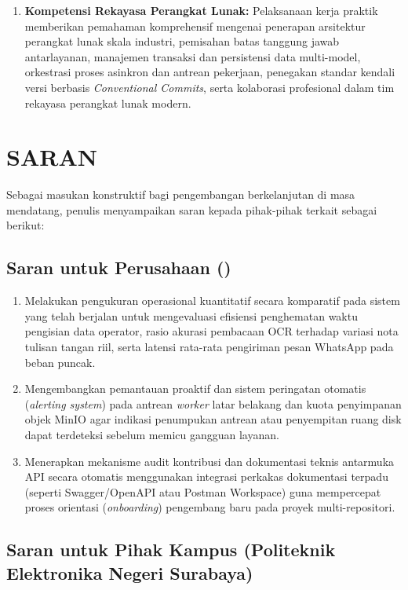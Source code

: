 \begin{enumerate}[label=\arabic*., leftmargin=*, itemsep=0pt]
  \item \textbf{Kompetensi Rekayasa Perangkat Lunak:} Pelaksanaan kerja praktik memberikan pemahaman komprehensif mengenai penerapan arsitektur perangkat lunak skala industri, pemisahan batas tanggung jawab antarlayanan, manajemen transaksi dan persistensi data multi-model, orkestrasi proses asinkron dan antrean pekerjaan, penegakan standar kendali versi berbasis \textit{Conventional Commits}, serta kolaborasi profesional dalam tim rekayasa perangkat lunak modern.
\end{enumerate}

\section{SARAN}

Sebagai masukan konstruktif bagi pengembangan berkelanjutan di masa mendatang, penulis menyampaikan saran kepada pihak-pihak terkait sebagai berikut:

\subsection{Saran untuk Perusahaan (\NamaPerusahaan)}

\begin{enumerate}[label=\arabic*., leftmargin=*, itemsep=0pt]
  \item Melakukan pengukuran operasional kuantitatif secara komparatif pada sistem yang telah berjalan untuk mengevaluasi efisiensi penghematan waktu pengisian data operator, rasio akurasi pembacaan OCR terhadap variasi nota tulisan tangan riil, serta latensi rata-rata pengiriman pesan WhatsApp pada beban puncak.
  \item Mengembangkan pemantauan proaktif dan sistem peringatan otomatis (\textit{alerting system}) pada antrean \textit{worker} latar belakang dan kuota penyimpanan objek MinIO agar indikasi penumpukan antrean atau penyempitan ruang disk dapat terdeteksi sebelum memicu gangguan layanan.
  \item Menerapkan mekanisme audit kontribusi dan dokumentasi teknis antarmuka API secara otomatis menggunakan integrasi perkakas dokumentasi terpadu (seperti Swagger/OpenAPI atau Postman Workspace) guna mempercepat proses orientasi (\textit{onboarding}) pengembang baru pada proyek multi-repositori.
\end{enumerate}

\subsection{Saran untuk Pihak Kampus (Politeknik Elektronika Negeri Surabaya)}

